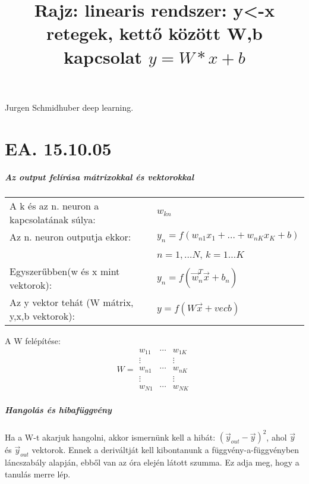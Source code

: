 \documentclass[10pt,a4paper]{report}
\begin{document}
\paragraph{}
Jurgen Schmidhuber deep learning.

\chapter{EA. 15.10.05}
\paragraph{Az output felírása mátrixokkal és vektorokkal}
\begin{tabular}{ll}
A k és az n. neuron a kapcsolatának súlya: &$ w_{kn} $\\
Az n. neuron outputja ekkor: &$y_n=f(w_{n1}x_1+\dots + w_{nK}x_K+b)$ \\ &$n=1,\dots N$, $k=1\dots K$\\
Egyszerűbben(w és x mint vektorok): &$y_n = f(\vec{w}_n^T\vec{x}+b_n)$\\
Az y vektor tehát (W mátrix, y,x,b vektorok): &$y = f(W\vec{x} + vec{b}) $\\
\end{tabular}

A W felépítése: 
\begin{equation}
W = \begin{matrix}
w_{11}&\cdots &w_{1K}\\
\vdots & &\vdots \\ 
w_{n1} &\cdots& w_{nK} \\
\vdots & &\vdots \\ 
w_{N1} &\cdots &w_{NK}
\end{matrix}
\end{equation}
\paragraph{Hangolás és hibafüggvény}
Ha a W-t akarjuk hangolni, akkor ismernünk kell a hibát: $(\vec{y}_{out} - \vec{y})^2$, ahol $\vec{y}$ és $\vec{y}_{out}$ vektorok. Ennek a deriváltját kell kibontanunk a függvény-a-függvényben láncszabály alapján, ebből van az óra elején látott szumma. Ez adja meg, hogy a tanulás merre lép. 
\begin{figure}[h]
\title{Rajz: linearis rendszer: y<-x retegek, kettő között W,b kapcsolat $y=W*x+b$}
\end{figure}
\end{document}
